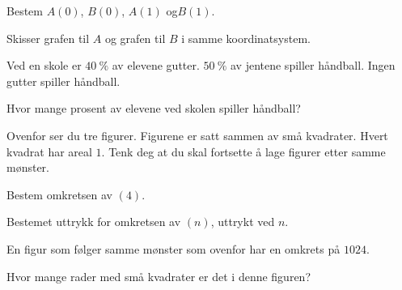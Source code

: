 \begin{oppgaver}
   Bestem $A(0)$, $B(0)$, $A(1)$ og$B(1)$.
\end{oppgaver}

\begin{oppgaver}
   Skisser grafen til $A$ og grafen til $B$ i samme koordinatsystem.
\end{oppgaver}


\Oppgave[2] 


Ved en skole er $\SI{40}{\percent}$ av elevene gutter. $\SI{50}{\percent}$ av
jentene spiller håndball. Ingen gutter spiller håndball. \bigskip

Hvor mange prosent av elevene ved skolen spiller håndball?


\Oppgave[5]

Ovenfor ser du tre figurer. Figurene er satt sammen av små kvadrater. Hvert
kvadrat har areal $1$. Tenk deg at du skal fortsette å lage figurer etter samme
mønster.

\begin{oppgaver}
   Bestem omkretsen av $(4)$.
\end{oppgaver}

\begin{oppgaver}
   Bestemet uttrykk for omkretsen av $(n)$, uttrykt ved $n$.
\end{oppgaver}

En figur som følger samme mønster som ovenfor har en omkrets på $1024$.

\begin{oppgaver}
   Hvor mange rader med små kvadrater er det i denne figuren?
\end{oppgaver}

